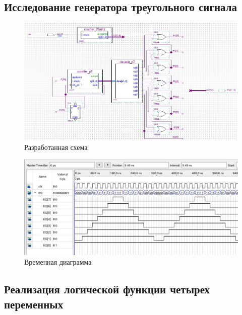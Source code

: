 \documentclass[a4paper,12pt]{article}
\begin{document}
    \subsection{Исследование генератора треугольного сигнала}
    \begin{figure}[H]
        \centering
        \includegraphics[width=\linewidth]{scheme_tria}
        \caption{Разработанная схема}
    \end{figure}
    \begin{figure}[H]
        \centering
        \includegraphics[width=\linewidth]{wave_tria}
        \caption{Временная диаграмма}
    \end{figure}

    \subsection{Реализация логической функции четырех переменных}
\end{document}
